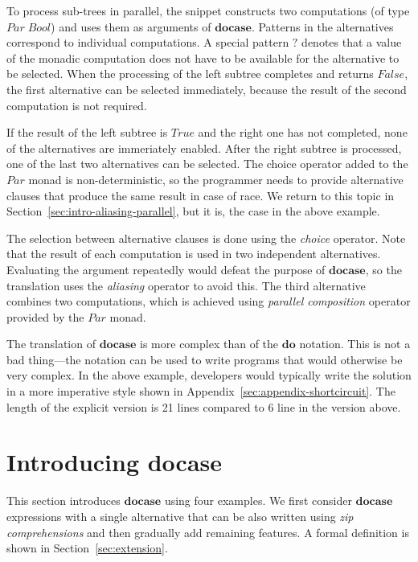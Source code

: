 \documentclass{sigplanconf}
\newcommand{\Conid}[1]{\mathit{#1}}
\begin{document}
To process sub-trees in parallel, the snippet constructs two computations (of type \ensuremath{\Conid{Par}\;\Conid{Bool}}) 
and uses them as arguments of \ensuremath{\mathbf{docase}}. Patterns in the alternatives correspond to individual
computations. A special pattern \ensuremath{\mathbin{?}} denotes that a value of the monadic computation does not 
have to be available for the alternative to be selected. When the processing of the left subtree 
completes and returns \ensuremath{\Conid{False}}, the first alternative can be selected immediately, because the 
result of the second computation is not required.

If the result of the left subtree is \ensuremath{\Conid{True}} and the right one has not completed, none of 
the alternatives are immeriately enabled. After the right subtree is processed, one of the last two alternatives 
can be selected. The choice operator added to the \ensuremath{\Conid{Par}} monad is non-deterministic, so the 
programmer needs to provide alternative clauses that produce the same result in case of race.
We return to this topic in Section~\ref{sec:intro-aliasing-parallel}, but it is, the case in 
the above example.

The selection between alternative clauses is done using the \textit{choice} operator. Note that the result 
of each computation is used in two independent alternatives. Evaluating the argument repeatedly 
would defeat the purpose of \ensuremath{\mathbf{docase}}, so the translation uses the \textit{aliasing} operator to avoid 
this. The third alternative combines two computations, which is achieved using \textit{parallel
composition} operator provided by the \ensuremath{\Conid{Par}} monad.

The translation of \ensuremath{\mathbf{docase}} is more complex than of the \ensuremath{\mathbf{do}} notation. This is not
a bad thing---the notation can be used to write programs that would otherwise be very complex. 
In the above example, developers would typically write the solution in a more imperative style 
shown in Appendix~\ref{sec:appendix-shortcircuit}. The length of the explicit version is 21 lines 
compared to 6 line in the version above. 


\section{Introducing docase}
This section introduces \ensuremath{\mathbf{docase}} using four examples. We first consider \ensuremath{\mathbf{docase}}
expressions with a single alternative that can be also written using \textit{zip comprehensions} 
\cite{comprefun} and then gradually add remaining features. A formal 
definition is shown in Section~\ref{sec:extension}.
\end{document}
